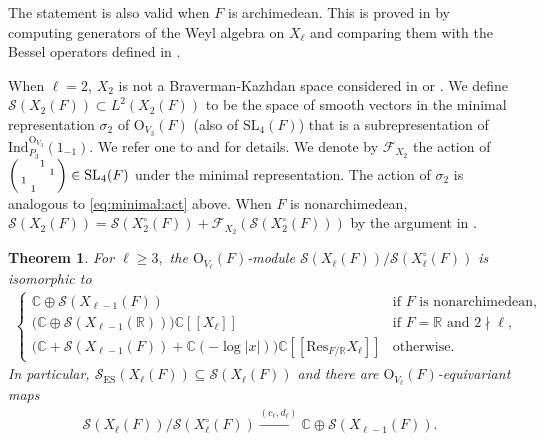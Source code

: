 \documentclass[11pt,a4paper,reqno]{amsart}
\newtheorem{thm}{Theorem}[section]
\theoremstyle{remark}
\numberwithin{equation}{section}
\newcommand{\SL}{\mathrm{SL}}
\newcommand{\CC}{\mathbb{C}}
\newcommand{\RR}{\mathbb{R}}
\theoremstyle{definition}
\numberwithin{equation}{section}
\newenvironment{psmatrix}
  {\left(\begin{smallmatrix}}
  {\end{smallmatrix}\right)}
\begin{document}
The statement is also valid when $F$ is archimedean.  This is proved in \cite[Example 7.10]{Hsu:asymptotics} by computing generators of the Weyl algebra on $X_\ell$ and comparing them with the Bessel operators defined in \cite{Kobayashi:Mano, minrep:real}.


When $\ell=2$,  $X_2$ is not a Braverman-Kazhdan space considered in \cite{Getz:Hsu:Leslie} or \cite{BKnormalized}. We define $\mathcal{S}(X_{2}(F))\subset L^2(X_{2}(F))$ to be the space of smooth vectors in the minimal representation $\sigma_2$ of $\mathrm{O}_{V_3}(F)$ (also of $\SL_4(F)$) that is a subrepresentation of $\mathrm{Ind}_{P_3}^{\mathrm{O}_{V_3}}(1_{-1})$. We refer one to  \cite{SW:minimal} and \cite{minrep:real} for details. We denote by $\mathcal{F}_{X_{2}}$ the action of $\begin{psmatrix}
     & & 1&\\
    & &  & 1\\
    1&  & & \\
    & 1 &  & 
\end{psmatrix}\in \SL_4(F)$ under the minimal representation. The action of $\sigma_2$ is analogous to \eqref{eq:minimal:act} above. When $F$ is nonarchimedean, $\mathcal{S}(X_{2}(F))=\mathcal{S}(X_{2}^\circ(F))+\mathcal{F}_{X_{2}}\left(\mathcal{S}(X_{2}^\circ(F))\right)$ by the argument in \cite[\S 2.2]{GK:cone}.







\begin{thm}\label{thm:asymplge3}
For $\ell \ge 3,$ the $\mathrm{O}_{V_\ell}(F)$-module $\mathcal{S}(X_\ell(F))/\mathcal{S}(X_\ell^\circ(F))$ is isomorphic to 
\begin{align*}
    \begin{cases}
        \CC\oplus\mathcal{S}(X_{\ell-1}(F)) & \textrm{if } F \textrm{ is nonarchimedean,}\\
        \bigg(\CC\oplus \mathcal{S}(X_{\ell-1}(\RR))\bigg)\CC[[X_\ell]] & \textrm{if } F=\RR \textrm{ and } 2\nmid \ell,\\
        \bigg(\CC+ \mathcal{S}(X_{\ell-1}(F))+\CC(-\log |x|)\bigg)\CC[[\mathrm{Res}_{F/\RR}X_\ell]]& \textrm{otherwise}.
    \end{cases}
\end{align*}
In particular, $\mathcal{S}_{\mathrm{ES}}(X_\ell(F))\subseteq \mathcal{S}(X_\ell(F))$ and there are $\mathrm{O}_{V_\ell}(F)$-equivariant maps
\begin{align*}
    \mathcal{S}(X_\ell(F))/\mathcal{S}(X_\ell^\circ(F))\xrightarrow{(c_\ell,d_\ell)} \CC\oplus \mathcal{S}(X_{\ell-1}(F)). 
\end{align*}
\end{thm}
\end{document}
